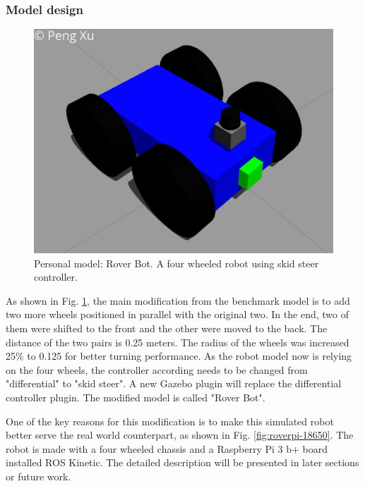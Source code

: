 \documentclass[10pt,journal,compsoc]{IEEEtran}
\begin{document}
\subsubsection{Model design}

\begin{figure}[thpb]
    \centering
    \includegraphics[width=\linewidth]{images/rover-bot.png}
    \caption{Personal model: Rover Bot. A four wheeled robot using skid steer controller.}
    \label{fig:rover-bot}
\end{figure}

As shown in Fig. \ref{fig:rover-bot}, the main modification from the benchmark model is to add two more wheels positioned in parallel with the original two. In the end, two of them were shifted to the front and the other were moved to the back. The distance of the two pairs is 0.25 meters. The radius of the wheels was increased 25\% to 0.125 for better turning performance. As the robot model now is relying on the four wheels, the controller according needs to be changed from "differential" to "skid steer". A new Gazebo plugin will replace the differential controller plugin. The modified model is called "Rover Bot".

One of the key reasons for this modification is to make this simulated robot better serve the real world counterpart, as shown in Fig. \ref{fig:roverpi-18650}. The robot is made with a four wheeled chassis and a Raspberry Pi 3 b+ board installed ROS Kinetic. The detailed description will be presented in later sections or future work.
\end{document}
